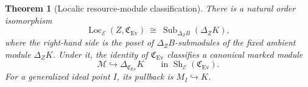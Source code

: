 \documentclass[11pt,a4paper]{article}
\numberwithin{algorithm}{section}
\numberwithin{equation}{section}
\newtheorem{theorem}{Theorem}[section]
\theoremstyle{definition}
\theoremstyle{remark}
\theoremstyle{plain}
\newcommand{\E}{\mathcal E}
\newcommand{\incl}{\hookrightarrow}
\newcommand{\Sub}{\operatorname{Sub}}
\newcommand{\Ev}{{\operatorname{Ev}}}
\newcommand{\Cplx}{\mathfrak C_{\Ev}}
\newcommand{\Sh}{\operatorname{Sh}}
\theoremstyle{definition}
\theoremstyle{plain}
\begin{document}
\begin{theorem}[Localic resource-module classification]
\label{thm:locale-modules}
There is a natural order isomorphism
\begin{equation}\label{eq:locale-modules}
 \operatorname{Loc}_{\E}(Z,\Cplx)
 \ \cong\ \Sub_{\Delta_ZB}(\Delta_ZK),
\end{equation}
where the right-hand side is the poset of
$\Delta_ZB$-submodules of the fixed ambient module $\Delta_ZK$.
Under it, the identity of $\Cplx$ classifies a canonical marked
module
\begin{equation}\label{eq:universal-module}
 \mathscr M\incl\Delta_{\Cplx}K
 \qquad\text{in }\Sh_{\E}(\Cplx).
\end{equation}
For a generalized ideal point $I$, its pullback is $M_I\incl K$.
\end{theorem}
\end{document}
